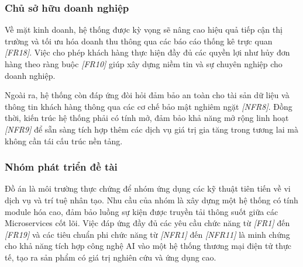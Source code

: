 \subsubsection{Chủ sở hữu doanh nghiệp}

Về mặt kinh doanh, hệ thống được kỳ vọng sẽ nâng cao hiệu quả tiếp cận thị trường và tối ưu hóa doanh thu thông qua các báo cáo thống kê trực quan \textit{[FR18]}. Việc cho phép khách hàng thực hiện đầy đủ các quyền lợi như hủy đơn hàng theo ràng buộc \textit{[FR10]} giúp xây dựng niềm tin và sự chuyên nghiệp cho doanh nghiệp. 

Ngoài ra, hệ thống còn đáp ứng đòi hỏi đảm bảo an toàn cho tài sản dữ liệu và thông tin khách hàng thông qua các cơ chế bảo mật nghiêm ngặt \textit{[NFR8]}. Đồng thời, kiến trúc hệ thống phải có tính mở, đảm bảo khả năng mở rộng linh hoạt \textit{[NFR9]} để sẵn sàng tích hợp thêm các dịch vụ giá trị gia tăng trong tương lai mà không cần tái cấu trúc nền tảng.

\subsubsection{Nhóm phát triển đề tài}

Đồ án là môi trường thực chứng để nhóm ứng dụng các kỹ thuật tiên tiến về vi dịch vụ và trí tuệ nhân tạo. Nhu cầu của nhóm là xây dựng một hệ thống có tính module hóa cao, đảm bảo luồng sự kiện được truyền tải thông suốt giữa các Microservices cốt lõi. Việc đáp ứng đầy đủ các yêu cầu chức năng từ \textit{[FR1]} đến \textit{[FR19]} và các tiêu chuẩn phi chức năng từ \textit{[NFR1]} đến \textit{[NFR11]} là minh chứng cho khả năng tích hợp công nghệ AI vào một hệ thống thương mại điện tử thực tế, tạo ra sản phẩm có giá trị nghiên cứu và ứng dụng cao.